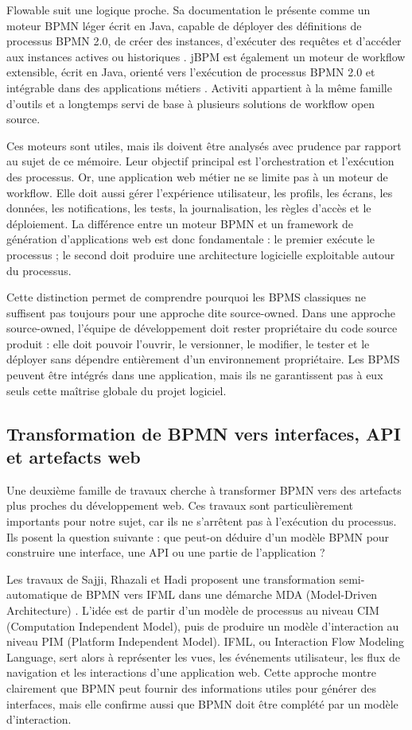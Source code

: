 Flowable suit une logique proche. Sa documentation le présente comme un
moteur BPMN léger écrit en Java, capable de déployer des définitions de
processus BPMN 2.0, de créer des instances, d'exécuter des requêtes et
d'accéder aux instances actives ou historiques \cite{flowable2026bpmn}. jBPM est
également un moteur de workflow extensible, écrit en Java, orienté vers
l'exécution de processus BPMN 2.0 et intégrable dans des applications
métiers \cite{jbpm2026docs}. Activiti appartient à la même famille d'outils et a
longtemps servi de base à plusieurs solutions de workflow open source.

Ces moteurs sont utiles, mais ils doivent être analysés avec prudence
par rapport au sujet de ce mémoire. Leur objectif principal est
l'orchestration et l'exécution des processus. Or, une application web
métier ne se limite pas à un moteur de workflow. Elle doit aussi gérer
l'expérience utilisateur, les profils, les écrans, les données, les
notifications, les tests, la journalisation, les règles d'accès et le
déploiement. La différence entre un moteur BPMN et un framework de
génération d'applications web est donc fondamentale : le premier exécute
le processus ; le second doit produire une architecture logicielle
exploitable autour du processus.

Cette distinction permet de comprendre pourquoi les BPMS classiques ne
suffisent pas toujours pour une approche dite source-owned. Dans une
approche source-owned, l'équipe de développement doit rester
propriétaire du code source produit : elle doit pouvoir l'ouvrir, le
versionner, le modifier, le tester et le déployer sans dépendre
entièrement d'un environnement propriétaire. Les BPMS peuvent être
intégrés dans une application, mais ils ne garantissent pas à eux seuls
cette maîtrise globale du projet logiciel.

\subsection{Transformation de BPMN vers interfaces, API et artefacts web}

Une deuxième famille de travaux cherche à transformer BPMN vers des
artefacts plus proches du développement web. Ces travaux sont
particulièrement importants pour notre sujet, car ils ne s'arrêtent pas
à l'exécution du processus. Ils posent la question suivante : que
peut-on déduire d'un modèle BPMN pour construire une interface, une API
ou une partie de l'application ?

Les travaux de Sajji, Rhazali et Hadi proposent une transformation
semi-automatique de BPMN vers IFML dans une démarche MDA (Model-Driven
Architecture) \cite{sajji2022}. L'idée est de partir d'un modèle de processus au
niveau CIM (Computation Independent Model), puis de produire un modèle
d'interaction au niveau PIM (Platform Independent Model). IFML, ou
Interaction Flow Modeling Language, sert alors à représenter les vues,
les événements utilisateur, les flux de navigation et les interactions
d'une application web. Cette approche montre clairement que BPMN peut
fournir des informations utiles pour générer des interfaces, mais elle
confirme aussi que BPMN doit être complété par un modèle d'interaction.

